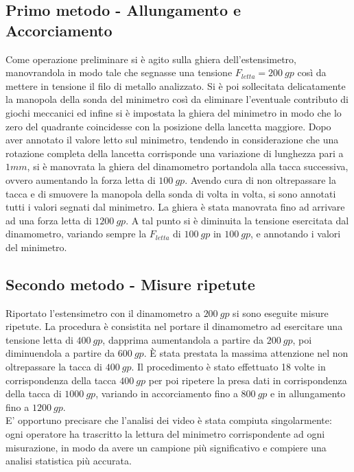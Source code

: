 \documentclass[a4paper,11pt,oneside]{article}
\begin{document}
\subsection{Primo metodo - Allungamento e Accorciamento}%
Come operazione preliminare si è agito sulla ghiera dell'estensimetro, manovrandola in modo tale che segnasse una tensione $F_{letta}=\SI{200}{gp}$ così da mettere in tensione il filo di metallo analizzato. Si è poi sollecitata delicatamente la manopola della sonda del minimetro così da eliminare l'eventuale contributo di giochi meccanici ed infine si è impostata la ghiera del minimetro in modo che lo zero del quadrante coincidesse con la posizione della lancetta maggiore. Dopo aver annotato il valore letto sul minimetro, tendendo in considerazione che una rotazione completa della lancetta corrisponde una variazione di lunghezza pari a $\num{1} \si{mm}$, si è manovrata la ghiera del dinamometro portandola alla tacca successiva, ovvero aumentando la forza letta di $\SI{100}{gp}$. Avendo cura di non oltrepassare la tacca e di smuovere la manopola della sonda di volta in volta, si sono annotati tutti i valori segnati dal minimetro. La ghiera è stata manovrata fino ad arrivare ad una forza letta di $\SI{1200}{gp}$. A tal punto si è diminuita la tensione esercitata dal dinamometro, variando sempre la $F_{letta}$ di $\SI{100}{gp}$ in $\SI{100}{gp}$, e annotando i valori del minimetro.\\

\subsection{Secondo metodo - Misure ripetute}%
Riportato l'estensimetro con il dinamometro a $\SI{200}{gp}$ si sono eseguite misure ripetute. La procedura è consistita nel portare il dinamometro ad esercitare una tensione letta di $\SI{400}{gp}$, dapprima aumentandola a partire da $\SI{200}{gp}$, poi diminuendola a partire da $\SI{600}{gp}$. È stata prestata la massima attenzione nel non oltrepassare la tacca di $\SI{400}{gp}$. %
Il procedimento è stato effettuato 18 volte in corrispondenza della tacca $\SI{400}{gp}$ per poi ripetere la presa dati in corrispondenza della tacca di $\SI{1000}{gp}$, variando in accorciamento fino a $\SI{800}{gp}$ e in allungamento fino a $\SI{1200}{gp}$.\\
E' opportuno precisare che l'analisi dei video è stata compiuta singolarmente: ogni operatore ha trascritto la lettura del minimetro corrispondente ad ogni misurazione, in modo da avere un campione più significativo e compiere una analisi statistica più accurata.
\end{document}
